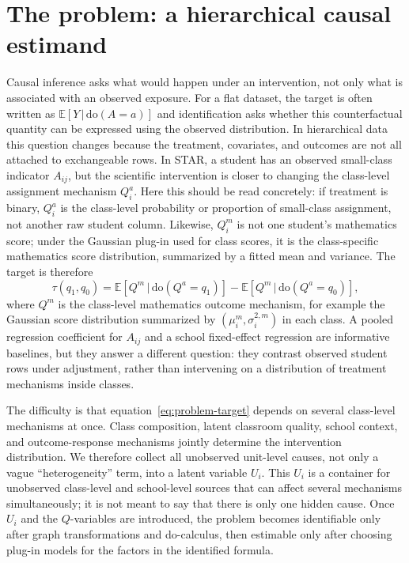 \documentclass[unnumsec,webpdf,contemporary,large]{oup-authoring-template}%
\theoremstyle{thmstyleone}%
\theoremstyle{thmstyletwo}%
\theoremstyle{thmstylethree}%
\newcommand{\E}[1]{\mathbb{E}\left[#1\right]}
\newcommand{\rmdo}{\mathrm{do}}
\newcommand{\g}{\,\vert\,}
\begin{document}
\section{The problem: a hierarchical causal estimand}
\label{sec:problem}

Causal inference asks what would happen under an intervention, not only what is associated with an observed exposure.
For a flat dataset, the target is often written as $\E{Y\g\rmdo(A=a)}$ and identification asks whether this counterfactual quantity can be expressed using the observed distribution.
In hierarchical data this question changes because the treatment, covariates, and outcomes are not all attached to exchangeable rows.
In STAR, a student has an observed small-class indicator $A_{ij}$, but the scientific intervention is closer to changing the class-level assignment mechanism $Q_i^a$.
Here this should be read concretely: if treatment is binary, $Q_i^a$ is the class-level probability or proportion of small-class assignment, not another raw student column.
Likewise, $Q_i^m$ is not one student's mathematics score; under the Gaussian plug-in used for class scores, it is the class-specific mathematics score distribution, summarized by a fitted mean and variance.
The target is therefore
\begin{equation}
  \tau(q_1,q_0)
  =
  \E{Q^m\g\rmdo(Q^a=q_1)}
  -
  \E{Q^m\g\rmdo(Q^a=q_0)},
  \label{eq:problem-target}
\end{equation}
where $Q^m$ is the class-level mathematics outcome mechanism, for example the Gaussian score distribution summarized by $(\mu_i^m,\sigma_i^{2,m})$ in each class.
A pooled regression coefficient for $A_{ij}$ and a school fixed-effect regression are informative baselines, but they answer a different question: they contrast observed student rows under adjustment, rather than intervening on a distribution of treatment mechanisms inside classes.

The difficulty is that equation~\eqref{eq:problem-target} depends on several class-level mechanisms at once.
Class composition, latent classroom quality, school context, and outcome-response mechanisms jointly determine the intervention distribution.
We therefore collect all unobserved unit-level causes, not only a vague ``heterogeneity'' term, into a latent variable $U_i$.
This $U_i$ is a container for unobserved class-level and school-level sources that can affect several mechanisms simultaneously; it is not meant to say that there is only one hidden cause.
Once $U_i$ and the $Q$-variables are introduced, the problem becomes identifiable only after graph transformations and do-calculus, then estimable only after choosing plug-in models for the factors in the identified formula.
\end{document}
